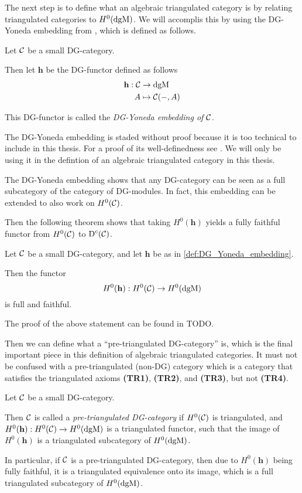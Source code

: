 The next step is to define what an algebraic triangulated category is by relating triangulated categories to \( H^0(\operatorname{dgM}) \). We will accomplis this by using the DG-Yoneda embedding from \cite[Corollary 6.3.6]{Borceux_1994}, which is defined as follows.
\begin{definition}
    \label{def:DG_Yoneda_embedding}
    Let \( {\mathcal{C}} \) be a small DG-category.
    
    Then let \( \mathbf{h} \) be the DG-functor defined as follows
    \begin{align*}
        \mathbf{h}: {\mathcal{C}} &\to \operatorname{dgM} \\
        A &\mapsto {\mathcal{C}}(-, A)
    \end{align*}

    This DG-functor is called the \emph{DG-Yoneda embedding of \( {\mathcal{C}} \)}.
\end{definition}

The DG-Yoneda embedding is staded without proof because it is too technical to include in this thesis. For a proof of its well-definedness see \cite[Corollary 6.3.6]{Borceux_1994}. We will only be using it in the defintion of an algebraic triangulated category in this thesis.

The DG-Yoneda embedding shows that any DG-category can be seen as a full subcategory of the category of DG-modules. In fact, this embedding can be extended to also work on \( H^0({\mathcal{C}}) \).

Then the following theorem shows that taking \( H^0(\mathbf{h}) \) yields a fully faithful functor from \( H^0({\mathcal{C}}) \) to \( \operatorname{D}^c({\mathcal{C}}) \).

\begin{theorem}
    Let \( {\mathcal{C}} \) be a small DG-category, and let \( \mathbf{h} \) be as in \autoref{def:DG_Yoneda_embedding}.

    Then the functor
    \[
        H^0(\mathbf{h}): H^0({\mathcal{C}}) \to H^0(\operatorname{dgM})
    \]
    is full and faithful.
\end{theorem}
The proof of the above statement can be found in TODO.

Then we can define what a ``pre-triangulated DG-category'' is, which is the final important piece in this definition of algebraic triangulated categories. It must not be confused with a pre-triangulated (non-DG) category which is a category that satisfies the triangulated axioms {\bf (TR1)}, {\bf (TR2)}, and {\bf (TR3)}, but not {\bf (TR4)}.
\begin{definition}
    \label{def:pre-tri_dg_cat}
    Let \( {\mathcal{C}} \) be a small DG-category.

    Then \( {\mathcal{C}} \) is called a \emph{pre-triangulated DG-category} if \( H^0({\mathcal{C}}) \) is triangulated, and \( H^0(\mathbf{h}): H^0({\mathcal{C}}) \to H^0(\operatorname{dgM}) \) is a triangulated functor, such that the image of \( H^0(\mathbf{h}) \) is a triangulated subcategory of \( H^0(\operatorname{dgM}) \).
\end{definition}
In particular, if \( {\mathcal{C}} \) is a pre-triangulated DG-category, then due to \( H^0(\mathbf{h}) \) being fully faithful, it is a triangulated equivalence onto its image, which is a full triangulated subcategory of \( H^0(\operatorname{dgM}) \).

